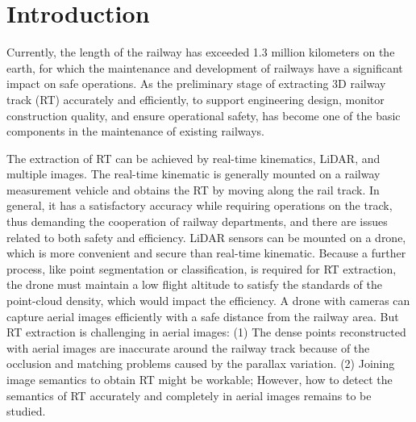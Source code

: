 \section{Introduction}

Currently,
the length of the railway has exceeded 1.3 million kilometers on the earth,
for which the maintenance and development of railways have a significant impact on safe operations.
As the preliminary stage of 
extracting 3D railway track (RT) accurately and efficiently, 
to support engineering design, monitor construction quality, 
and ensure operational safety,
has become one of the basic components in the maintenance of existing railways.

The extraction of RT can be achieved by real-time kinematics, LiDAR,
and multiple images.
The real-time kinematic is generally mounted on a railway measurement vehicle and obtains the RT by moving along the rail track.
In general, 
it has a satisfactory accuracy while requiring operations on the track,
thus demanding the cooperation of railway departments, 
and there are issues related to both safety and efficiency.
LiDAR sensors can be mounted on a drone, 
which is more convenient and secure than real-time kinematic. 
Because a further process, 
like point segmentation or classification,
is required for RT extraction,
the drone must maintain a low flight altitude to satisfy the standards of the point-cloud density,
which would impact the efficiency.
A drone with cameras can capture aerial images efficiently with a safe distance from the railway area.
But RT extraction is challenging in aerial images:
(1) The dense points reconstructed with aerial images are inaccurate around the railway track because of the occlusion and matching problems caused by the parallax variation.
(2) Joining image semantics to obtain RT might be workable;
However,
how to detect the semantics of RT accurately and completely in aerial images remains to be studied.

